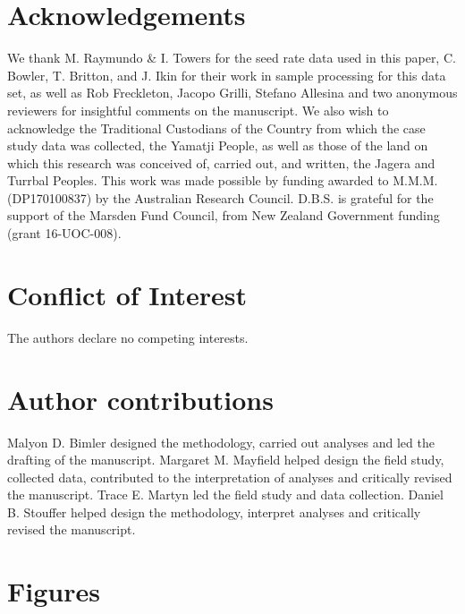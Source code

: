 \documentclass[a4,12pt]{article}
\begin{document}
\begin{refsection}
\section*{Acknowledgements}

We thank M. Raymundo \& I. Towers for the seed rate data used in this paper, C. Bowler, T. Britton, and J. Ikin for their work in sample processing for this data set, as well as Rob Freckleton, Jacopo Grilli, Stefano Allesina and two anonymous reviewers for insightful comments on the manuscript. We also wish to acknowledge the Traditional Custodians of the Country from which the case study data was collected, the Yamatji People, as well as those of the land on which this research was conceived of, carried out, and written, the Jagera and Turrbal Peoples. This work was made possible by funding awarded to M.M.M. (DP170100837) by the Australian Research Council. D.B.S. is grateful for the support of the Marsden Fund Council, from New Zealand Government funding (grant 16-UOC-008).


\section*{Conflict of Interest}

The authors declare no competing interests. 

\section*{Author contributions}

Malyon D. Bimler designed the methodology, carried out analyses and led the drafting of the manuscript. Margaret M. Mayfield helped design the field study, collected data, contributed to the interpretation of analyses and critically revised the manuscript. Trace E. Martyn led the field study and data collection. Daniel B. Stouffer helped design the methodology, interpret analyses and critically revised the manuscript. 

\newpage

\printbibliography   

\end{refsection}

\newpage 

\section{Figures}


\end{document}
